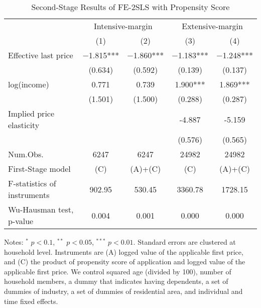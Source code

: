 \begin{table}

\caption{Second-Stage Results of FE-2SLS with Propensity Score \label{tab:psiv-stage2}}
\centering
\begin{threeparttable}
\begin{tabular}[t]{lcccc}
\toprule
\multicolumn{1}{c}{ } & \multicolumn{2}{c}{Intensive-margin} & \multicolumn{2}{c}{Extensive-margin} \\
\cmidrule(l{3pt}r{3pt}){2-3} \cmidrule(l{3pt}r{3pt}){4-5}
  & (1) & (2) & (3) & (4)\\
\midrule
Effective last price & \num{-1.815}*** & \num{-1.860}*** & \num{-1.183}*** & \num{-1.248}***\\
 & (\num{0.634}) & (\num{0.592}) & (\num{0.139}) & (\num{0.137})\\
log(income) & \num{0.771} & \num{0.739} & \num{1.900}*** & \num{1.869}***\\
 & (\num{1.501}) & (\num{1.500}) & (\num{0.288}) & (\num{0.287})\\
\midrule
Implied price elasticity &  &  & -4.887 & -5.159\\
 &  &  & (0.576) & (0.565)\\
Num.Obs. & \num{6247} & \num{6247} & \num{24982} & \num{24982}\\
First-Stage model & (C) & (A)+(C) & (C) & (A)+(C)\\
F-statistics of instruments & 902.95 & 530.45 & 3360.78 & 1728.15\\
Wu-Hausman test, p-value & 0.004 & 0.001 & 0.000 & 0.000\\
\bottomrule
\end{tabular}
\begin{tablenotes}
\item Notes: $^{*}$ $p < 0.1$, $^{**}$ $p < 0.05$, $^{***}$ $p < 0.01$. Standard errors are clustered at household level. Instruments are (A) logged value of the applicable first price, and (C) the product of propensity score of application and logged value of the applicable first price. We control squared age (divided by 100), number of household members, a dummy that indicates having dependents, a set of dummies of industry, a set of dummies of residential area, and individual and time fixed effects.
\end{tablenotes}
\end{threeparttable}
\end{table}
